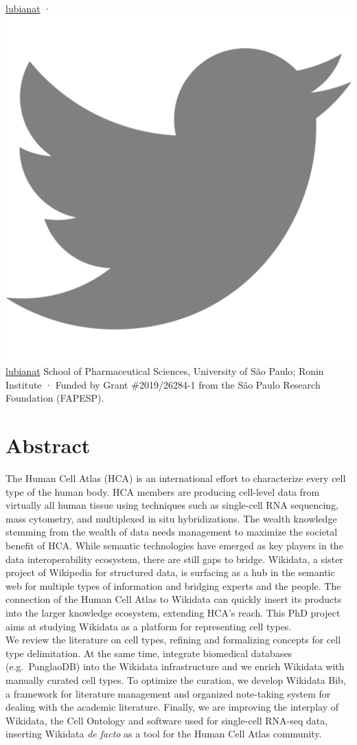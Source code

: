 \begin{itemize}
  \href{https://github.com/lubianat}{lubianat}
  · \includegraphics[width=0.85\columnwidth]{images/twitter.svg.png}
  \href{https://twitter.com/lubianat}{lubianat}
  School of Pharmaceutical Sciences, University of São Paulo; Ronin Institute
  · Funded by Grant \#2019/26284-1 from the São Paulo Research Foundation (FAPESP).
\end{itemize}

\hypertarget{abstract}{%
\section{Abstract}\label{abstract}}

The Human Cell Atlas (HCA) is an international effort to characterize every cell type of the human body.
HCA members are producing cell-level data from virtually all human tissue using techniques such as single-cell RNA sequencing, mass cytometry, and multiplexed in situ hybridizations.
The wealth knowledge stemming from the wealth of data needs management to maximize the societal benefit of HCA.
While semantic technologies have emerged as key players in the data interoperability ecosystem, there are still gaps to bridge.
Wikidata, a sister project of Wikipedia for structured data, is surfacing as a hub in the semantic web for multiple types of information and bridging experts and the people.
The connection of the Human Cell Atlas to Wikidata can quickly insert its products into the larger knowledge ecosystem, extending HCA's reach.
This PhD project aims at studying Wikidata as a platform for representing cell types.\\
We review the literature on cell types, refining and formalizing concepts for cell type delimitation.
At the same time, integrate biomedical databases (e.g.~PanglaoDB) into the Wikidata infrastructure and we enrich Wikidata with manually curated cell types.
To optimize the curation, we develop Wikidata Bib, a framework for literature management and organized note-taking system for dealing with the academic literature.
Finally, we are improving the interplay of Wikidata, the Cell Ontology and software used for single-cell RNA-seq data, inserting Wikidata \emph{de facto} as a tool for the Human Cell Atlas community.

